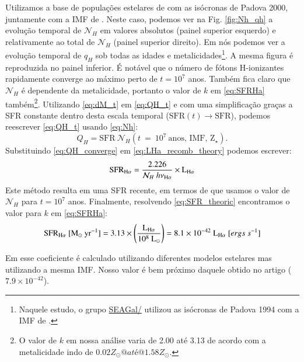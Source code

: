 Utilizamos a base de populações estelares de \citet{BC03a} com as isócronas de Padova 2000,
juntamente com a IMF de \citet{Salpeter.1955a}. Neste caso, podemos ver na Fig. \ref{fig:Nh_qh} a
evolução temporal de $\mathcal{N}_H$ em valores absolutos (painel superior esquerdo) e relativamente
ao total de $\mathcal{N}_H$ (painel superior direito). Em \citet[Fig. 2b]{CidFernandes.etal.2011a}
nós podemos ver a evolução temporal de $q_H$ sob todas as idades e metalicidades\footnote{Naquele
estudo, o grupo \href{http://starlight.ufsc.br}{SEAGal/\STARLIGHT} utilizou as isócronas de Padova
1994 com a IMF de \citet{Chabrier.2003a}.}. A mesma figura é reproduzida no painel inferior. É
notável que o número de fótons H-ionizantes rapidamente converge ao máximo perto de $t = 10^7$ anos.
Também fica claro que $\mathcal{N}_H$ é dependente da metalicidade, portanto o valor de $k$ em
\eqref{eq:SFRHa} também\footnote{O valor de $k$ em nossa análise varia de 2.00 até 3.13 de
acordo com a metalicidade indo de $0.02 Z_\odot@ até @1.58 Z_\odot$.}. Utilizando \eqref{eq:dM_t}
em \eqref{eq:QH_t} e com uma simplificação graças a SFR constante dentro desta escala temporal
($\mathrm{SFR}(t)\rightarrow \mathrm{SFR}$), podemos reescrever \eqref{eq:QH_t} usando
\eqref{eq:Nh}:
\begin{equation}
	Q_H = \mathrm{SFR}\ \mathcal{N}_H(t\ =\ 10^7\ \textrm{anos, IMF, Z}{}_\star).
	\label{eq:QH_converge}
\end{equation}
\noindent Substituindo \eqref{eq:QH_converge} em \eqref{eq:LHa_recomb_theory} podemos escrever:
\begin{equation}
	\mathrm{SFR}_{\Halpha} = \frac{2.226}{\mathcal{N}_H\ h \nu_{\Halpha}} \times \LHalpha
	\label{eq:SFR_theoric}
\end{equation}
\noindent Este método resulta em uma SFR recente, em termos de que usamos o valor de $\mathcal{N}_H$
para $t = 10^7$ anos. Finalmente, resolvendo \eqref{eq:SFR_theoric} encontramos o valor para $k$ em
\eqref{eq:SFRHa}:
\begin{equation}
	\mathrm{SFR}_{\Halpha}\ [\mathrm{M}_\odot\ \mathrm{yr}^{-1}] = 3.13 \times
	\left(\frac{\LHalpha}{10^8\ \mathrm{L}_\odot}\right) = 8.1 \times 10^{-42}\ \LHalpha\ [ergs\ s^{-1}]
	\label{eq:SFRNeb}
\end{equation}

Em \citet{Kennicutt.1998a} esse coeficiente é calculado utilizando diferentes modelos estelares mas
utilizando a mesma IMF. Nosso valor é bem próximo daquele obtido no artigo ($7.9 \times 10^{-42}$). 

